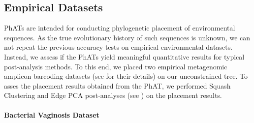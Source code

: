 

\subsection{Empirical Datasets}
\label{ch:AutomaticTrees:sec:Evaluation:sub:EmpiricalDatasets}

\acp{PhAT} are intended for conducting phylogenetic placement of environmental sequences.
As the true evolutionary history of such sequences is unknown,
we can not repeat the previous accuracy tests on empirical environmental datasets.
Instead, we assess if the \acp{PhAT} yield meaningful quantitative results for typical post-analysis methods.
To this end, we placed two empirical metagenomic amplicon barcoding datasets
(see  for their details) on our unconstrained  tree.
To asses the placement results obtained from the \ac{PhAT},
we performed Squash Clustering and Edge PCA \citep{Matsen2011a} post-analyses
(see ) on the placement results.


\paragraph{Bacterial Vaginosis Dataset}
\label{ch:AutomaticTrees:sec:Evaluation:sub:EmpiricalDatasets:par:BV}

